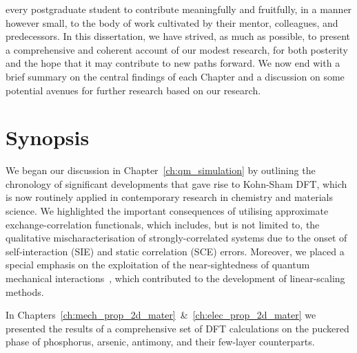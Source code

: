 
every postgraduate student  
to contribute meaningfully and fruitfully, 
in a manner however small, 
to the body of work cultivated   
by their mentor, colleagues, 
and predecessors.
%
In this dissertation, 
we have strived, as much as possible, 
to present a comprehensive and 
coherent account of our modest research, 
for both posterity and the hope 
that it may contribute to new paths forward.
%
We now end with 
a brief summary on the central findings of each Chapter 
and a discussion on some potential avenues 
for further research based on our research.


\section{Synopsis}

We began our discussion in Chapter~\ref{ch:qm_simulation} 
by outlining the chronology of 
significant developments that gave rise to Kohn-Sham DFT, 
which is now  routinely applied in contemporary research 
in chemistry and materials science.
%
We highlighted the important consequences 
of utilising approximate exchange-correlation functionals, 
which includes, but is not limited to, 
the qualitative mischaracterisation 
of strongly-correlated systems 
due to the onset of self-interaction (SIE) 
and static correlation (SCE) errors.
%
Moreover, 
we placed a special emphasis on 
the exploitation of the near-sightedness of 
quantum mechanical interactions~\cite{PhysRevLett.76.3168}, 
which contributed to the development of 
linear-scaling methods.
%

In Chapters~\ref{ch:mech_prop_2d_mater}~\&~\ref{ch:elec_prop_2d_mater} 
we presented the results of a 
comprehensive set of DFT calculations 
on the puckered phase of 
phosphorus, arsenic, antimony, 
and their few-layer counterparts.
%

